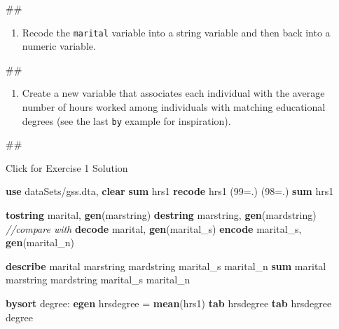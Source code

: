 \documentclass[
]{book}
\newenvironment{Shaded}{\begin{snugshade}}{\end{snugshade}}
\newcommand{\CommentTok}[1]{\textcolor[rgb]{0.56,0.35,0.01}{\textit{#1}}}
\newcommand{\KeywordTok}[1]{\textcolor[rgb]{0.13,0.29,0.53}{\textbf{#1}}}
\newcommand{\NormalTok}[1]{#1}
\providecommand{\tightlist}{%
  \setlength{\itemsep}{0pt}\setlength{\parskip}{0pt}}
\begin{document}
\begin{Shaded}
\begin{Highlighting}[]
\NormalTok{\#\#}
\end{Highlighting}
\end{Shaded}

\begin{enumerate}
\def\labelenumi{\arabic{enumi}.}
\setcounter{enumi}{1}
\tightlist
\item
  Recode the \texttt{marital} variable into a string variable and then back into a numeric variable.
\end{enumerate}

\begin{Shaded}
\begin{Highlighting}[]
\NormalTok{\#\#}
\end{Highlighting}
\end{Shaded}

\begin{enumerate}
\def\labelenumi{\arabic{enumi}.}
\setcounter{enumi}{2}
\tightlist
\item
  Create a new variable that associates each individual with the average number of hours worked among individuals with matching educational degrees (see the last \texttt{by} example for inspiration).
\end{enumerate}

\begin{Shaded}
\begin{Highlighting}[]
\NormalTok{\#\#}
\end{Highlighting}
\end{Shaded}

{Click for Exercise 1 Solution}

\begin{alert}

\begin{Shaded}
\begin{Highlighting}[]
\KeywordTok{use}\NormalTok{ dataSets/gss.dta, }\KeywordTok{clear}
\KeywordTok{sum}\NormalTok{ hrs1}
\KeywordTok{recode}\NormalTok{ hrs1 (99=.) (98=.) }
\KeywordTok{sum}\NormalTok{ hrs1}

\KeywordTok{tostring}\NormalTok{ marital, }\KeywordTok{gen}\NormalTok{(marstring)}
\KeywordTok{destring}\NormalTok{ marstring, }\KeywordTok{gen}\NormalTok{(mardstring)}
\CommentTok{//compare with}
\KeywordTok{decode}\NormalTok{ marital, }\KeywordTok{gen}\NormalTok{(marital\_s)}
\KeywordTok{encode}\NormalTok{ marital\_s, }\KeywordTok{gen}\NormalTok{(marital\_n)}

\KeywordTok{describe}\NormalTok{ marital marstring mardstring marital\_s marital\_n}
\KeywordTok{sum}\NormalTok{ marital marstring mardstring marital\_s marital\_n}

\KeywordTok{bysort}\NormalTok{ degree: }\KeywordTok{egen}\NormalTok{ hrsdegree = }\KeywordTok{mean}\NormalTok{(hrs1)}
\KeywordTok{tab}\NormalTok{ hrsdegree}
\KeywordTok{tab}\NormalTok{ hrsdegree degree }
\end{Highlighting}
\end{Shaded}

\end{alert}
\end{document}
